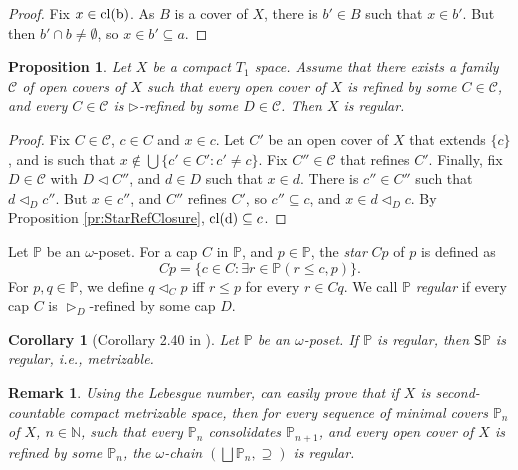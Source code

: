 \documentclass[12pt]{amsart}
\theoremstyle{plain}
\newtheorem{corollary}[theorem]{\bf Corollary}
\newtheorem{remark}[theorem]{\bf Remark}
\newtheorem{proposition}[theorem]{\bf Proposition}
\newcommand {\cl}[1]{{\rm{cl}(#1)}}
\newcommand \Sp{{\mathsf{S}}}
\newcommand \NN{\mathbb{N}}
\newcommand \PPb{\mathbb{P}}
\begin{document}
	\begin{proof}
	Fix $x \in \cl{b}$. As $B$ is a cover of $X$, there is $b' \in B$ such that $x \in b'$. But then $b' \cap b \neq \emptyset$, so $x \in b' \subseteq  a$.
	\end{proof}
		
	
\begin{proposition}%
\label{pr:Regular}
Let $X$ be a compact $T_1$ space.  Assume that there exists a family $\mathcal{C}$ of open covers of $X$ such that every open cover of $X$ is refined by some $C \in \mathcal{C}$, and every $C \in \mathcal{C}$ is $\rhd$-refined by some $D \in \mathcal{C}$. Then $X$ is regular.
\end{proposition}

\begin{proof}
Fix $C \in \mathcal{C}$, $c \in C$ and $x \in c$. Let $C'$ be an open cover of $X$ that extends $\{c\}$, and is such that $x \not \in \bigcup \{c' \in C': c' \neq c\}$. Fix $C'' \in \mathcal{C}$ that refines $C'$. Finally, fix $D \in \mathcal{C}$ with $D \lhd C''$, and $d \in D$ such that $x \in d$. There is $c'' \in C''$ such that $d \lhd_D c''$. But $x \in c''$, and $C''$ refines $C'$, so $c'' \subseteq c$, and $x \in d \lhd_D c$. By Proposition \ref{pr:StarRefClosure}, $\cl{d} \subseteq c$.
\end{proof}	

Let $\PPb$ be an $\omega$-poset.  For a cap $C$ in $\PPb$, and $p \in \PPb$, the \emph{star} $Cp$ of $p$ is  defined as $$Cp=\{c \in C: \exists r \in \PPb (r \leq c,p) \}.$$ For $p, q \in \PPb$, we define $q \lhd_C p$ iff $r \leq p$ for every $r \in Cq$. We call $\PPb$ \emph{regular} if every cap  $C$ is $\rhd_D$-refined by some cap $D$. %

\begin{corollary}[Corollary 2.40 in \cite{BaBiVi}]
\label{co:Regular}
Let $\PPb$ be an $\omega$-poset. If $\PPb$ is regular, then $\Sp \PPb$ is regular, i.e., metrizable. 
\end{corollary}

\begin{remark}
\label{re:MetrizablePosetIsRegular}
Using the Lebesgue number, can easily prove that if $X$ is second-countable compact metrizable space, then for every sequence of minimal covers $\PPb_n$ of $X$, $n \in \NN$, such that every $\PPb_n$ consolidates  $\PPb_{n+1}$, and every open cover of $X$ is refined by some  $\PPb_n$, the $\omega$-chain $(\bigsqcup \PPb_n, \supseteq)$ is regular.
\end{remark}
\end{document}
